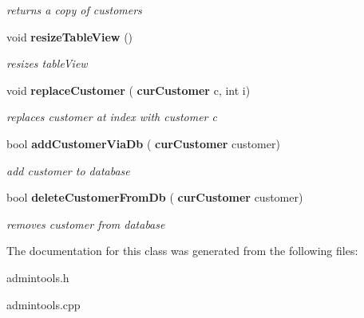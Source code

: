 \begin{DoxyCompactItemize}
\begin{DoxyCompactList}\small\item\em returns a copy of customers \end{DoxyCompactList}\item 
\mbox{\label{classadmin_tools_ad17635aafa91769def4e20417afa2227}} 
void \textbf{ resize\+Table\+View} ()
\begin{DoxyCompactList}\small\item\em resizes table\+View \end{DoxyCompactList}\item 
\mbox{\label{classadmin_tools_ac164ae5820f11ed0a8b9e489c2aa75eb}} 
void \textbf{ replace\+Customer} (\textbf{ cur\+Customer} c, int i)
\begin{DoxyCompactList}\small\item\em replaces customer at index with customer c \end{DoxyCompactList}\item 
\mbox{\label{classadmin_tools_aabec75751f239c2332a93af823b57e47}} 
bool \textbf{ add\+Customer\+Via\+Db} (\textbf{ cur\+Customer} customer)
\begin{DoxyCompactList}\small\item\em add customer to database \end{DoxyCompactList}\item 
\mbox{\label{classadmin_tools_a2d64c36a19dda76b9079cfde1a826c52}} 
bool \textbf{ delete\+Customer\+From\+Db} (\textbf{ cur\+Customer} customer)
\begin{DoxyCompactList}\small\item\em removes customer from database \end{DoxyCompactList}\end{DoxyCompactItemize}


The documentation for this class was generated from the following files\+:\begin{DoxyCompactItemize}
\item 
admintools.\+h\item 
admintools.\+cpp\end{DoxyCompactItemize}
